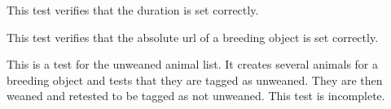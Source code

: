 \documentclass[letterpaper,10pt,english]{sphinxmanual}
\begin{document}
\begin{fulllineitems}
\begin{fulllineitems}
\label{animals:mousedb.animal.tests.BreedingModelTests.test_duration}
This test verifies that the duration is set correctly.

\end{fulllineitems}


\begin{fulllineitems}
\label{animals:mousedb.animal.tests.BreedingModelTests.test_study_absolute_url}
This test verifies that the absolute url of a breeding object is set correctly.

\end{fulllineitems}


\begin{fulllineitems}
\label{animals:mousedb.animal.tests.BreedingModelTests.test_unweaned}
This is a test for the unweaned animal list.  It creates several animals for a breeding object and tests that they are tagged as unweaned.  They are then weaned and retested to be tagged as not unweaned.  This test is incomplete.

\end{fulllineitems}


\end{fulllineitems}

\end{document}
